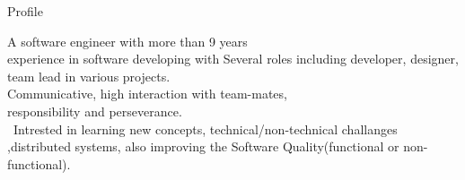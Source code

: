
\begin{jrsection}[location = sidebar]{Profile}
    \begin{jrdescription}
    A software engineer with more than 9 years  \\
    experience in software developing with Several roles including developer, designer, team lead in various projects.\\
    Communicative, high interaction with team-mates,\\
    responsibility and perseverance.\\ \linebreak\
    Intrested in learning new concepts, technical/non-technical challanges ,distributed
    systems, also improving the Software Quality(functional or non-functional).\\
    \end{jrdescription}
\end{jrsection}
